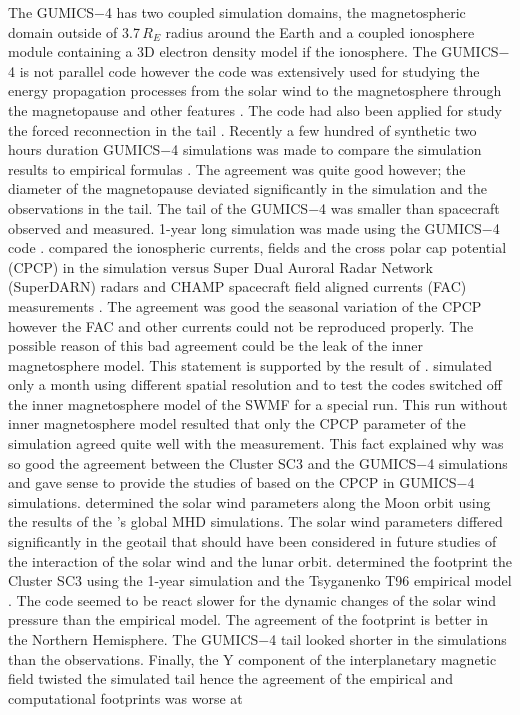 \documentclass[linenumbers,draft]{agujournal}
\begin{document}
The GUMICS$-$4 has two coupled simulation domains, the magnetospheric domain outside of 3.7\,$R_E$ radius around the Earth and a coupled ionosphere module containing a 3D electron density model if the ionosphere. The GUMICS$-$4 is not parallel code however the code was extensively used for studying the energy propagation processes from the solar wind to the magnetosphere through the magnetopause and other features \citep[][see the references therein]{janhunen12:_gumic_mhd}. The code had also been applied for study the forced reconnection in the tail \citep{voeroes14:_winds_condit_ram_co_ram}. Recently a few hundred of synthetic two hours duration GUMICS$-$4 simulations was made to compare the simulation results to empirical formulas \citep{gordeev13:_verif_gumic_mhd}. The agreement was quite good however; the diameter of the magnetopause deviated significantly in the simulation and the observations in the tail. The tail of the GUMICS$-$4 was smaller than spacecraft observed and measured. 1-year long simulation was made using the GUMICS$-$4 code \citep{facsko16:_one_earth}. \citet{juusola14:_statis_gumic_mhd} compared the ionospheric currents, fields and the cross polar cap potential (CPCP) in the simulation versus Super Dual Auroral Radar Network (SuperDARN) radars \citep{greenwald95:_darn_super} and CHAMP spacecraft \citep{reigber02:_champ} field aligned currents (FAC) measurements \citep{juusola07:_hall_peder_champ,ritter04:_ionos_champ_image}. The agreement was good the seasonal variation of the CPCP however the FAC and other currents could not be reproduced properly. The possible reason of this bad agreement could be the leak of the inner magnetosphere model. This statement is supported by the result of \citet{haiducek17:_swmf_global_magnet_simul_januar}. \citeauthor{haiducek17:_swmf_global_magnet_simul_januar} simulated only a month using different spatial resolution and to test the codes switched off the inner magnetosphere model of the SWMF for a special run.  This run without inner magnetosphere model resulted that only the CPCP parameter of the simulation agreed quite well with the measurement. This fact explained why was so good the agreement between the Cluster SC3 and the GUMICS$-$4 simulations and gave sense to provide the studies of \citet{lakka18:_cross_polar_cap_satur_gumic,lakka18:_icme_earth_mach} based on the CPCP in GUMICS$-$4 simulations. \citet{kallio15:_proper} determined the solar wind parameters along the Moon orbit using the results of the \citet{facsko16:_one_earth}'s global MHD simulations. The solar wind parameters differed significantly in the geotail that should have been considered in future studies of the interaction of the solar wind and the lunar orbit. \citet{facsko16:_one_earth} determined the footprint the Cluster SC3 using the 1-year simulation and the Tsyganenko T96 empirical model \citep{tsyganenko95:_model_earth}. The code seemed to be react slower for the dynamic changes of the solar wind pressure than the empirical model. The agreement of the footprint is better in the Northern Hemisphere. The GUMICS$-$4 tail looked shorter in the simulations than the observations. Finally, the Y component of the interplanetary magnetic field twisted the simulated tail hence the agreement of the empirical and computational footprints was worse at 
\end{document}
